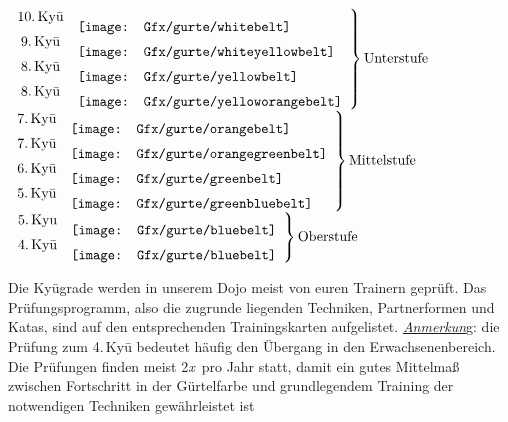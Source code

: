 	\setlength{\tabcolsep}{3pt}
	\null\vfill\null
	\begin{center}
	\parbox{\textwidth-2\tabcolsep}{
		\begin{center}
			$\left.\begin{array}{cl} \text{10.\,Ky\={u}} & \raisebox{-7.2pt}{\texttt{[image: Gfx/gurte/whitebelt]}}\\ \text{9.\,Ky\={u}} & \raisebox{-7.2pt}{\texttt{[image: Gfx/gurte/whiteyellowbelt]}}\\ \text{8.\,Ky\={u}} & \raisebox{-7.2pt}{\texttt{[image: Gfx/gurte/yellowbelt]}}\\ \text{8.\,Ky\={u}}& \raisebox{-7.2pt}{\texttt{[image: Gfx/gurte/yelloworangebelt]}}\end{array} \right\}\text{Unterstufe}$\quad$\left.\begin{array}{cl} \text{7.\,Ky\={u}} & \raisebox{-7.2pt}{\texttt{[image: Gfx/gurte/orangebelt]}} \\ \text{7.\,Ky\={u}} & \raisebox{-7.2pt}{\texttt{[image: Gfx/gurte/orangegreenbelt]}}\\ \text{6.\,Ky\={u}} & \raisebox{-7.2pt}{\texttt{[image: Gfx/gurte/greenbelt]}}\\ \text{5.\,Ky\={u}} & \raisebox{-7.2pt}{\texttt{[image: Gfx/gurte/greenbluebelt]}}\end{array} \right\}\text{Mittelstufe}$\quad$\left.\begin{array}{cl} \text{5.\,Kyu} & \raisebox{-7.2pt}{\texttt{[image: Gfx/gurte/bluebelt]}}\\ \text{4.\,Ky\={u}} & \raisebox{-7.2pt}{\texttt{[image: Gfx/gurte/bluebelt]}} \end{array} \right\}\text{Oberstufe}$
		\end{center}
		Die Ky\={u}grade werden in unserem Dojo meist von euren Trainern geprüft. Das Prüfungsprogramm, also die zugrunde liegenden Techniken, Partnerformen und Katas, sind auf den entsprechenden Trainingskarten aufgelistet. \textit{\underline{Anmerkun}}g: die Prüfung zum 4.\,Ky\={u} bedeutet häufig den Übergang in den Erwachsenenbereich.\\

		Die Prüfungen finden meist 2\textit{x}\, pro Jahr statt, damit ein gutes Mittelmaß zwischen Fortschritt in der Gürtelfarbe und grundlegendem Training der notwendigen Techniken gewährleistet ist\\}

	\end{center}\null\vfill\null
	\setlength{\tabcolsep}{6pt}